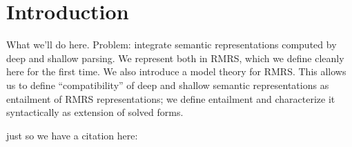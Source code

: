 \section{Introduction} \label{sec:introduction}

What we'll do here.  Problem: integrate semantic representations
computed by deep and shallow parsing.  We represent both in RMRS,
which we define cleanly here for the first time.  We also introduce a
model theory for RMRS.  This allows us to define ``compatibility'' of
deep and shallow semantic representations as entailment of RMRS
representations; we define entailment and characterize it
syntactically as extension of solved forms.

just so we have a citation here: \cite{Copestake_etal:MRS}

